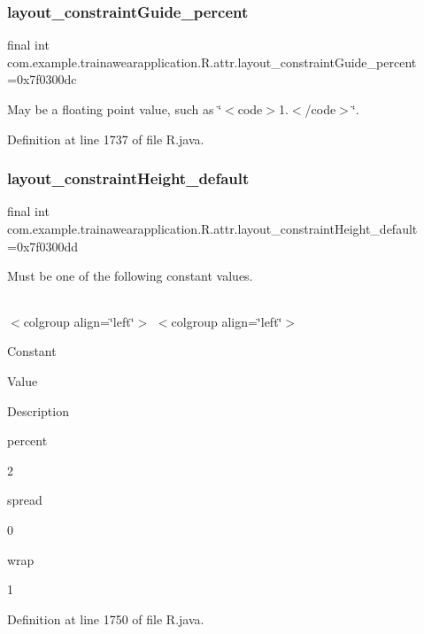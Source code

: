 \subsubsection{\texorpdfstring{layout\_constraintGuide\_percent}{layout\_constraintGuide\_percent}}
{\footnotesize\ttfamily final int com.\+example.\+trainawearapplication.\+R.\+attr.\+layout\+\_\+constraint\+Guide\+\_\+percent =0x7f0300dc\hspace{0.3cm}{\ttfamily [static]}}

May be a floating point value, such as \char`\"{}$<$code$>$1.$<$/code$>$\char`\"{}. 

Definition at line 1737 of file R.\+java.

\mbox{\label{classcom_1_1example_1_1trainawearapplication_1_1_r_1_1attr_a3c743d4cbefab1c22ca077f9fa6ee7f3}} 
\subsubsection{\texorpdfstring{layout\_constraintHeight\_default}{layout\_constraintHeight\_default}}
{\footnotesize\ttfamily final int com.\+example.\+trainawearapplication.\+R.\+attr.\+layout\+\_\+constraint\+Height\+\_\+default =0x7f0300dd\hspace{0.3cm}{\ttfamily [static]}}

Must be one of the following constant values.

\tabulinesep=1mm
\begin{longtabu}spread 0pt [c]{*{0}{|X[-1]}|}
\hline
\end{longtabu}
$<$colgroup align=\char`\"{}left\char`\"{}$>$ $<$colgroup align=\char`\"{}left\char`\"{}$>$ 

Constant

Value

Description 

percent

2

spread

0

wrap

1

Definition at line 1750 of file R.\+java.

